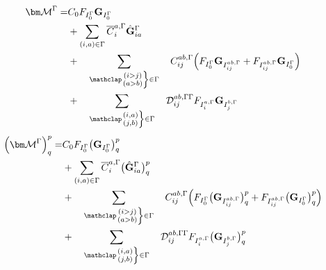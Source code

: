 \documentclass[a4paper,11pt]{article}
\begin{document}
\begin{equation}
  \begin{split}
    \matM^\irp = &
    C_0 F_{I_0^\irp} \matG_{I_0^\irp}\\
    & + \sum_{(i,a) \in \irp} \overline{C}_i^{a,\irp}
    \hat{\matG}_{ia}^\irp \\
    & + \sumijabrestr C_{ij}^{ab, \irp}
    \Big(
        F_{I_0^\irp} \matG_{I_{ij}^{ab,\irp}} + F_{I_{ij}^{ab,\irp}} \matG_{I_0^\irp}
    \Big)\\
    & + \sumijabfull \Dmix_{ij}^{ab, \irp\irp}
    F_{I_i^{a,\irp}} \matG_{I_j^{b,\irp}}\\
  \end{split}
\end{equation}
\begin{equation}
  \begin{split}
    \Big(\matM^\irp\Big)^p_q = &
    C_0 F_{I_0^\irp} \big( \matG_{I_0^\irp} \big)^p_q\\
    & + \sum_{(i,a) \in \irp} \overline{C}_i^{a,\irp}
    \big( \hat{\matG}_{ia}^\irp \big)^p_q\\
    & + \sumijabrestr C_{ij}^{ab, \irp}
    \Big(
        F_{I_0^\irp} \big( \matG_{I_{ij}^{ab,\irp}} \big)^p_q
        + F_{I_{ij}^{ab,\irp}} \big( \matG_{I_0^\irp} \big)^p_q
    \Big)\\
    & + \sumijabfull \Dmix_{ij}^{ab, \irp\irp} F_{I_i^{a,\irp}}
    \big( \matG_{I_j^{b,\irp}} \big)^p_q
  \end{split}
\end{equation}
\end{document}
